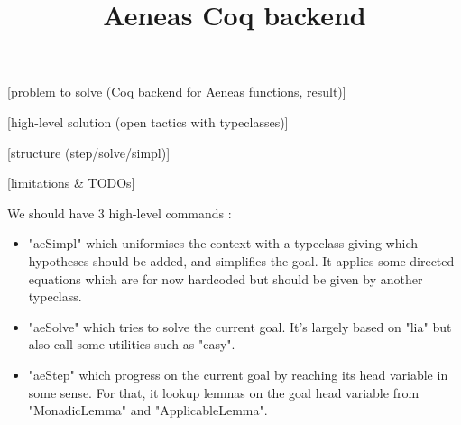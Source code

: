 \documentclass{article}
\title{Aeneas Coq backend}
\begin{document}
\maketitle

[problem to solve (Coq backend for Aeneas functions, result)]

[high-level solution (open tactics with typeclasses)]

[structure (step/solve/simpl)]

[limitations \& TODOs]

We should have 3 high-level commands :

\begin{itemize}
\item "aeSimpl" which uniformises the context with a typeclass giving which hypotheses should be added, and simplifies the goal. It applies some directed equations which are for now hardcoded but should be given by another typeclass.
\item "aeSolve" which tries to solve the current goal. It's largely based on "lia" but also call some utilities such as "easy".
\item "aeStep" which progress on the current goal by reaching its head variable in some sense. For that, it lookup lemmas on the goal head variable from "MonadicLemma" and "ApplicableLemma".
\end{itemize}
\end{document}
